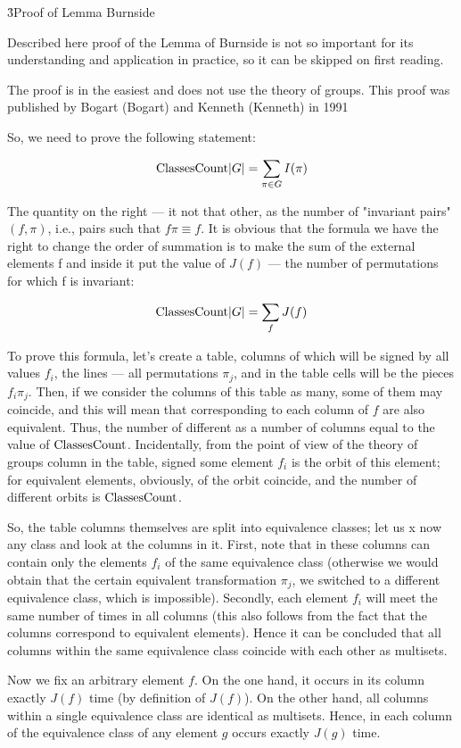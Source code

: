 \h3{Proof of Lemma Burnside}

Described here proof of the Lemma of Burnside is not so important for its understanding and application in practice, so it can be skipped on first reading.

The proof is in the easiest and does not use the theory of groups. This proof was published by Bogart (Bogart) and Kenneth (Kenneth) in 1991

So, we need to prove the following statement:

$$ {\rm ClassesCount} |G| = \sum_{\pi \in G} I(\pi) $$

The quantity on the right --- it not that other, as the number of "invariant pairs" $(f, \pi)$, i.e., pairs such that $f \pi \equiv f$. It is obvious that the formula we have the right to change the order of summation is to make the sum of the external elements f and inside it put the value of $J(f)$ --- the number of permutations for which f is invariant:

$$ {\rm ClassesCount} |G| = \sum_{f} J(f) $$

To prove this formula, let's create a table, columns of which will be signed by all values $f_i$, the lines --- all permutations $\pi_j$, and in the table cells will be the pieces $f_i \pi_j$. Then, if we consider the columns of this table as many, some of them may coincide, and this will mean that corresponding to each column of $f$ are also equivalent. Thus, the number of different as a number of columns equal to the value of $\rm ClassesCount$. Incidentally, from the point of view of the theory of groups column in the table, signed some element $f_i$ is the orbit of this element; for equivalent elements, obviously, of the orbit coincide, and the number of different orbits is $\rm ClassesCount$.

So, the table columns themselves are split into equivalence classes; let us x now any class and look at the columns in it. First, note that in these columns can contain only the elements $f_i$ of the same equivalence class (otherwise we would obtain that the certain equivalent transformation $\pi_j$, we switched to a different equivalence class, which is impossible). Secondly, each element $f_i$ will meet the same number of times in all columns (this also follows from the fact that the columns correspond to equivalent elements). Hence it can be concluded that all columns within the same equivalence class coincide with each other as multisets.

Now we fix an arbitrary element $f$. On the one hand, it occurs in its column exactly $J(f)$ time (by definition of $J(f)$). On the other hand, all columns within a single equivalence class are identical as multisets. Hence, in each column of the equivalence class of any element $g$ occurs exactly $J(g)$ time.

